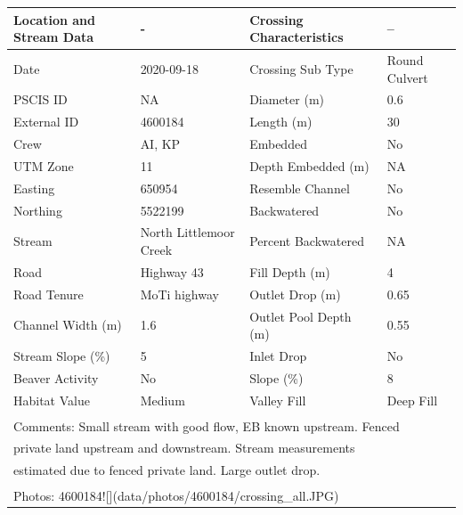\documentclass[
]{book}
\begin{document}
\begin{tabular}{llll}
\toprule
Location and Stream Data & - & Crossing Characteristics & --\\
\midrule
Date & 2020-09-18 & Crossing Sub Type & Round Culvert\\
PSCIS ID & NA & Diameter (m) & 0.6\\
External ID & 4600184 & Length (m) & 30\\
Crew & AI, KP & Embedded & No\\
UTM Zone & 11 & Depth Embedded (m) & NA\\
\addlinespace
Easting & 650954 & Resemble Channel & No\\
Northing & 5522199 & Backwatered & No\\
Stream & North Littlemoor Creek & Percent Backwatered & NA\\
Road & Highway 43 & Fill Depth (m) & 4\\
Road Tenure & MoTi highway & Outlet Drop (m) & 0.65\\
\addlinespace
Channel Width (m) & 1.6 & Outlet Pool Depth (m) & 0.55\\
Stream Slope (\%) & 5 & Inlet Drop & No\\
Beaver Activity & No & Slope (\%) & 8\\
Habitat Value & Medium & Valley Fill & Deep Fill\\
\bottomrule
\multicolumn{4}{l}{\textsuperscript{} Comments: Small stream with good flow, EB known upstream. Fenced}\\
\multicolumn{4}{l}{private land upstream and downstream. Stream measurements}\\
\multicolumn{4}{l}{estimated due to fenced private land.  Large outlet drop.}\\
\multicolumn{4}{l}{\textsuperscript{} Photos: 4600184![](data/photos/4600184/crossing\_all.JPG)}\\
\end{tabular}
\end{document}
